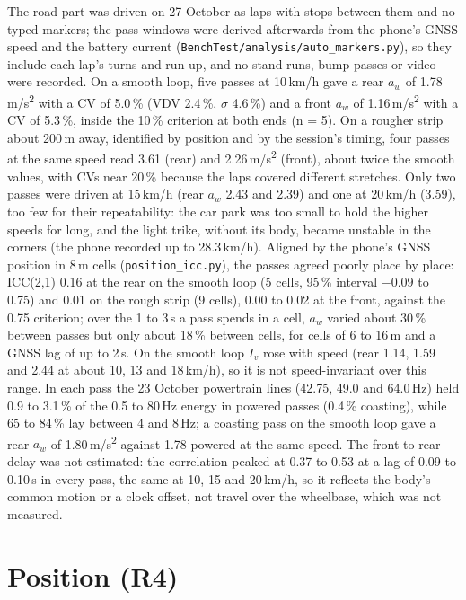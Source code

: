 The road part was driven on 27 October as laps with stops between them and no typed markers; the pass windows were derived afterwards from the phone's GNSS speed and the battery current (\texttt{BenchTest/\allowbreak{}analysis/\allowbreak{}auto\_markers.py}), so they include each lap's turns and run-up, and no stand runs, bump passes or video were recorded. On a smooth loop, five passes at 10\,km/h gave a rear $a_w$ of 1.78\,m/s\textsuperscript{2} with a CV of 5.0\,\% (VDV 2.4\,\%, $\sigma$ 4.6\,\%) and a front $a_w$ of 1.16\,m/s\textsuperscript{2} with a CV of 5.3\,\%, inside the 10\,\% criterion at both ends (n = 5). On a rougher strip about 200\,m away, identified by position and by the session's timing, four passes at the same speed read 3.61 (rear) and 2.26\,m/s\textsuperscript{2} (front), about twice the smooth values, with CVs near 20\,\% because the laps covered different stretches. Only two passes were driven at 15\,km/h (rear $a_w$ 2.43 and 2.39) and one at 20\,km/h (3.59), too few for their repeatability: the car park was too small to hold the higher speeds for long, and the light trike, without its body, became unstable in the corners (the phone recorded up to 28.3\,km/h). Aligned by the phone's GNSS position in 8\,m cells (\texttt{position\_icc.py}), the passes agreed poorly place by place: ICC(2,1) 0.16 at the rear on the smooth loop (5 cells, 95\,\% interval $-0.09$ to 0.75) and 0.01 on the rough strip (9 cells), 0.00 to 0.02 at the front, against the 0.75 criterion; over the 1 to 3\,s a pass spends in a cell, $a_w$ varied about 30\,\% between passes but only about 18\,\% between cells, for cells of 6 to 16\,m and a GNSS lag of up to 2\,s. On the smooth loop $I_v$ rose with speed (rear 1.14, 1.59 and 2.44 at about 10, 13 and 18\,km/h), so it is not speed-invariant over this range. In each pass the 23 October powertrain lines (42.75, 49.0 and 64.0\,Hz) held 0.9 to 3.1\,\% of the 0.5 to 80\,Hz energy in powered passes (0.4\,\% coasting), while 65 to 84\,\% lay between 4 and 8\,Hz; a coasting pass on the smooth loop gave a rear $a_w$ of 1.80\,m/s\textsuperscript{2} against 1.78 powered at the same speed. The front-to-rear delay was not estimated: the correlation peaked at 0.37 to 0.53 at a lag of 0.09 to 0.10\,s in every pass, the same at 10, 15 and 20\,km/h, so it reflects the body's common motion or a clock offset, not travel over the wheelbase, which was not measured.

\section{Position (R4)}
\label{sec:res-position}

